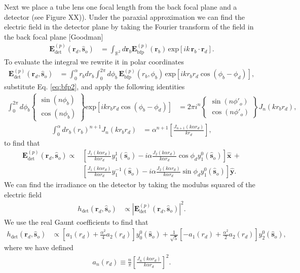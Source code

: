 \documentclass{osa-article}
\providecommand{\mb}[1]{\mathbf{#1}}
\providecommand{\so}[1]{\mathbf{\hat{s}}_o}
\providecommand{\rb}[1]{\mathbf{r}_b}
\providecommand{\rd}[1]{\mathbf{r}_d}
\providecommand{\mh}[1]{\mathbf{\hat{#1}}}
\providecommand{\mbb}[1]{\mathbb{#1}}
\begin{document}
Next we place a tube lens one focal length from the back focal plane and a
detector (see Figure XX)). Under the paraxial approximation we can find the
electric field in the detector plane by taking the Fourier transform of the
field in the back focal plane [Goodman]
\begin{align}
  \mb{E}_{\text{det}}^{(p)}(\rd{}, \so{}) &= \int_{\mbb{R}^2}d\rb{} \mb{E}_{\text{bfp}}^{(p)}(\rb{})\, \text{exp}\left[ik\,\rb{}\cdot\rd{}\right].\label{eq:det1}
\end{align}
To evaluate the integral we rewrite it in polar coordinates
\begin{align}
\mb{E}_{\text{det}}^{(p)}(\rd{}, \so{}) &= \int_{0}^{\alpha}r_bdr_b\int_0^{2\pi} d\phi_b\, \mb{E}_{\text{bfp}}^{(p)}(r_b, \phi_b)\, \text{exp}\left[ikr_b r_d\cos(\phi_b - \phi_d)\right],
\end{align}
substitute Eq. \ref{eq:bfp2}, and apply the following identities
\begin{align}
  \int_0^{2\pi}d\phi_b
  \left\{\substack{
    \sin(n\phi_b)\\
    \cos(n\phi_b)
  }\right\}
  \text{exp}\left[ikr_br_d\cos(\phi_b - \phi_d)\right] &= 2\pi i^n
  \left\{\substack{
    \sin(n\phi'_o)\\
    \cos(n\phi'_o)
  }\right\}J_n(k r_br_d),
  \end{align}
  \begin{align}
  \int_0^{\alpha} dr_b (r_b)^{n+1}J_{n}(kr_br_d) &= \alpha^{n+1}\left[\frac{J_{n+1}(k\alpha r_d)}{k r_d}\right],
  \end{align}
to find that 
\begin{align}
  \mb{E}_{\text{det}}^{(p)}(\rd{}, \so{}) \propto &\left[\frac{J_1(k\alpha r_d)}{k\alpha r_d}y_1^1(\so{}) - i\alpha \frac{J_2(k\alpha r_d)}{k\alpha r_d}\cos\phi_d y_1^0(\so{})\right]\mh{x}\, + \nonumber \\& \left[\frac{J_1(k\alpha r_d)}{k\alpha r_d}y_1^{-1}(\so{}) - i\alpha \frac{J_2(k\alpha r_d)}{k\alpha r_d}\sin\phi_d y_1^0(\so{})\right]\mh{y}.
\end{align}
We can find the irradiance on the detector by taking the modulus squared of the
electric field
\begin{align}
  h_{\text{det}}(\rd{}, \so{}) &\propto |\mb{E}_{\text{det}}^{(p)}(\rd{}, \so{})|^2.
\end{align}
We use the real Gaunt coefficients to find that
\begin{align}
h_{\text{det}}(\rd{}, \so{}) &\propto \left[a_1( r_d) + \frac{\alpha^2}{4} a_2( r_d)\right]y_0^0(\so{}) + \frac{1}{\sqrt{5}}\left[- a_1( r_d) + \frac{\alpha^2}{2} a_2( r_d)\right]y_2^0(\so{}), \label{eq:detection}
\end{align}
where we have defined
\begin{align}
  a_n(r_d) \equiv \frac{n}{\pi}\left[\frac{J_n(k\alpha r_d)}{k\alpha r_d}\right]^2. 
\end{align}
\end{document}
